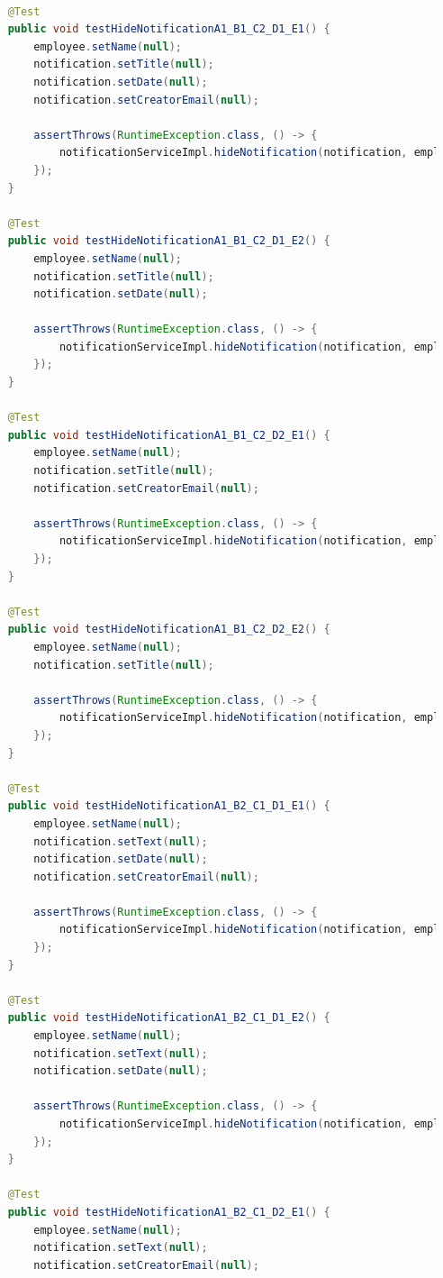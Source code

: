 \begin{lstlisting}[language=java]

    @Test
    public void testHideNotificationA1_B1_C2_D1_E1() {
        employee.setName(null);
        notification.setTitle(null);
        notification.setDate(null);
        notification.setCreatorEmail(null);

        assertThrows(RuntimeException.class, () -> {
            notificationServiceImpl.hideNotification(notification, employee);
        });
    }

    @Test
    public void testHideNotificationA1_B1_C2_D1_E2() {
        employee.setName(null);
        notification.setTitle(null);
        notification.setDate(null);

        assertThrows(RuntimeException.class, () -> {
            notificationServiceImpl.hideNotification(notification, employee);
        });
    }

    @Test
    public void testHideNotificationA1_B1_C2_D2_E1() {
        employee.setName(null);
        notification.setTitle(null);
        notification.setCreatorEmail(null);

        assertThrows(RuntimeException.class, () -> {
            notificationServiceImpl.hideNotification(notification, employee);
        });
    }

    @Test
    public void testHideNotificationA1_B1_C2_D2_E2() {
        employee.setName(null);
        notification.setTitle(null);

        assertThrows(RuntimeException.class, () -> {
            notificationServiceImpl.hideNotification(notification, employee);
        });
    }

    @Test
    public void testHideNotificationA1_B2_C1_D1_E1() {
        employee.setName(null);
        notification.setText(null);
        notification.setDate(null);
        notification.setCreatorEmail(null);

        assertThrows(RuntimeException.class, () -> {
            notificationServiceImpl.hideNotification(notification, employee);
        });
    }

    @Test
    public void testHideNotificationA1_B2_C1_D1_E2() {
        employee.setName(null);
        notification.setText(null);
        notification.setDate(null);

        assertThrows(RuntimeException.class, () -> {
            notificationServiceImpl.hideNotification(notification, employee);
        });
    }

    @Test
    public void testHideNotificationA1_B2_C1_D2_E1() {
        employee.setName(null);
        notification.setText(null);
        notification.setCreatorEmail(null);


\end{lstlisting}
